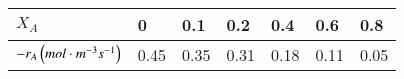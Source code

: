 \begin{table}[H]
\centering
\begin{tabularx}{0.7\textwidth}{|l|X|X|X|X|X|X|}
\hline
\textbf{$X_A$} & 0 & 0.1 & 0.2 & 0.4 & 0.6 & 0.8  \\
\hline
$-r_A\left(mol\cdot m^{-3}s^{-1}\right)$ & 0.45 & 0.35 & 0.31 & 0.18 & 0.11 & 0.05 \\
\hline
\end{tabularx}
\caption*{}
\label{tables:59}
\end{table}